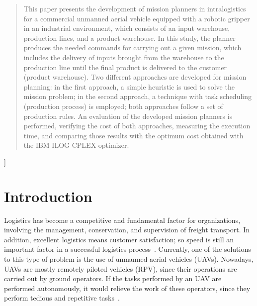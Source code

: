 \documentclass[conference,harvard,brazil,english]{sbatex}
\begin{document}
\begin{abstract}
This paper presents the development of mission planners in intralogistics for a commercial unmanned aerial vehicle equipped with a robotic gripper in an industrial environment, which consists of an input warehouse, production lines, and a product warehouse. In this study, the planner produces the needed commands for carrying out a given mission, which includes the delivery of inputs brought from the warehouse to the production line until the final product is delivered to the customer (product warehouse). Two different approaches are developed for mission planning: in the first approach, a simple heuristic is used to solve the mission problem; in the second approach, a technique with task scheduling (production process) is employed; both approaches follow a set of production rules. An evaluation of the developed mission planners is performed, verifying the cost of both approaches, measuring the execution time, and comparing those results with the optimum cost obtained with the IBM ILOG CPLEX optimizer.
\end{abstract}

]


\section{Introduction}
\label{sec:introduction}


Logistics has become a competitive and fundamental factor for organizations, involving the management, conservation, and supervision of freight transport. In addition, excellent logistics means customer satisfaction; so speed is still an important factor in a successful logistics process~\cite{drone4logistic}. Currently, one of the solutions to this type of problem is the use of unmanned aerial vehicles (UAVs). Nowadays, UAVs are mostly remotely piloted vehicles (RPV), since their operations are carried out by ground operators. If the tasks performed by an UAV are performed autonomously, it would relieve the work of these operators, since they perform tedious and repetitive tasks~\cite{pascarella2013autonomic}.
\end{document}
